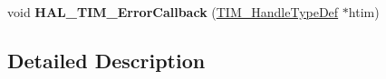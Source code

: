 \begin{DoxyCompactItemize}
\item 
\hypertarget{group___t_i_m___exported___functions___group9_ga6f0868af383d592940700dbb52fac016}{void {\bfseries H\-A\-L\-\_\-\-T\-I\-M\-\_\-\-Error\-Callback} (\hyperlink{struct_t_i_m___handle_type_def}{T\-I\-M\-\_\-\-Handle\-Type\-Def} $\ast$htim)}\label{group___t_i_m___exported___functions___group9_ga6f0868af383d592940700dbb52fac016}

\end{DoxyCompactItemize}


\subsection{Detailed Description}
